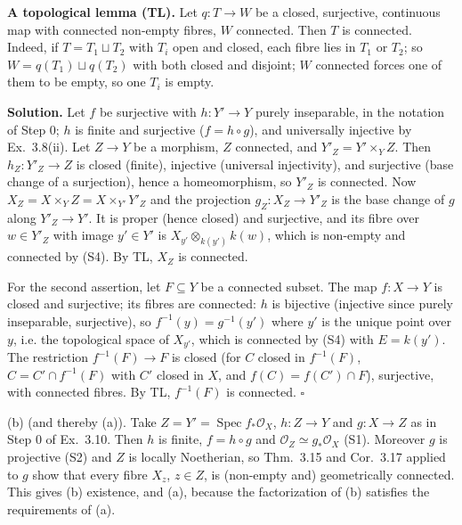 \documentclass[11pt]{article}
\begin{document}
\textbf{A topological lemma (TL).} Let $q:T\to W$ be a closed, surjective, continuous map with connected non-empty fibres, $W$ connected. Then $T$ is connected. Indeed, if $T=T_1\sqcup T_2$ with $T_i$ open and closed, each fibre lies in $T_1$ or $T_2$; so $W=q(T_1)\sqcup q(T_2)$ with both closed and disjoint; $W$ connected forces one of them to be empty, so one $T_i$ is empty.

\textbf{Solution.} Let $f$ be surjective with $h:Y'\to Y$ purely inseparable, in the notation of Step 0; $h$ is finite and surjective ($f=h\circ g$), and universally injective by Ex.~3.8(ii). Let $Z\to Y$ be a morphism, $Z$ connected, and $Y'_Z=Y'\times_YZ$. Then $h_Z:Y'_Z\to Z$ is closed (finite), injective (universal injectivity), and surjective (base change of a surjection), hence a homeomorphism, so $Y'_Z$ is connected. Now $X_Z=X\times_YZ=X\times_{Y'}Y'_Z$ and the projection $g_Z:X_Z\to Y'_Z$ is the base change of $g$ along $Y'_Z\to Y'$. It is proper (hence closed) and surjective, and its fibre over $w\in Y'_Z$ with image $y'\in Y'$ is $X_{y'}\otimes_{k(y')}k(w)$, which is non-empty and connected by (S4). By TL, $X_Z$ is connected.

For the second assertion, let $F\subseteq Y$ be a connected subset. The map $f:X\to Y$ is closed and surjective; its fibres are connected: $h$ is bijective (injective since purely inseparable, surjective), so $f^{-1}(y)=g^{-1}(y')$ where $y'$ is the unique point over $y$, i.e. the topological space of $X_{y'}$, which is connected by (S4) with $E=k(y')$. The restriction $f^{-1}(F)\to F$ is closed (for $C$ closed in $f^{-1}(F)$, $C=C'\cap f^{-1}(F)$ with $C'$ closed in $X$, and $f(C)=f(C')\cap F$), surjective, with connected fibres. By TL, $f^{-1}(F)$ is connected. \hfill$\square$

\pf
(b) (and thereby (a)). Take $Z=Y'=\operatorname{Spec}f_*\mathcal O_X$, $h:Z\to Y$ and $g:X\to Z$ as in Step 0 of Ex.~3.10. Then $h$ is finite, $f=h\circ g$ and $\mathcal O_Z\simeq g_*\mathcal O_X$ (S1). Moreover $g$ is projective (S2) and $Z$ is locally Noetherian, so Thm.~3.15 and Cor.~3.17 applied to $g$ show that every fibre $X_z$, $z\in Z$, is (non-empty and) geometrically connected. This gives (b) existence, and (a), because the factorization of (b) satisfies the requirements of (a).
\end{document}
